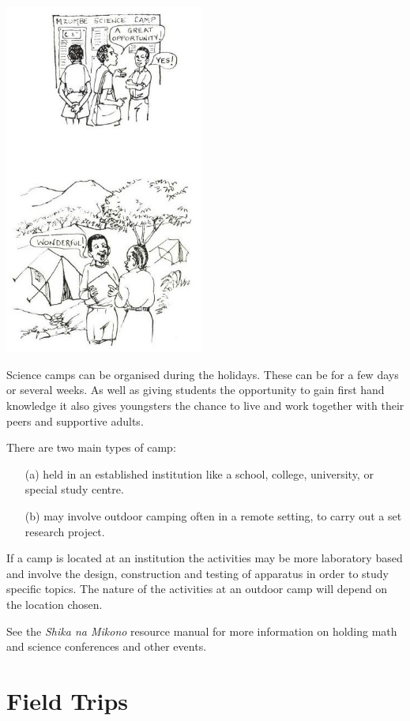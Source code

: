 \begin{multicols}{2}
\begin{center}
\includegraphics[width=0.49\textwidth]{./img/source/science-camps.jpg}
\end{center}

Science camps can be organised during the
holidays. These can be for a few days or several
weeks. As well as giving students the opportunity
to gain first hand knowledge it also gives
youngsters the chance to live and work together
with their peers and supportive adults.

There are two main types of camp:
\begin{enumerate}
\item[(a)] held in an
established institution like a school, college,
university, or special study centre.
\item[(b)] may
involve outdoor camping often in a remote
setting, to carry out a set research project.
\end{enumerate} 
If a camp is located at an institution the activities
may be more laboratory based and involve the
design, construction and testing of apparatus in
order to study specific topics. The nature of the
activities at an outdoor camp will depend on the
location chosen.

See the \emph{Shika na Mikono} resource manual for more information on holding math and science conferences and other events.


\section{Field Trips}


\end{multicols}
